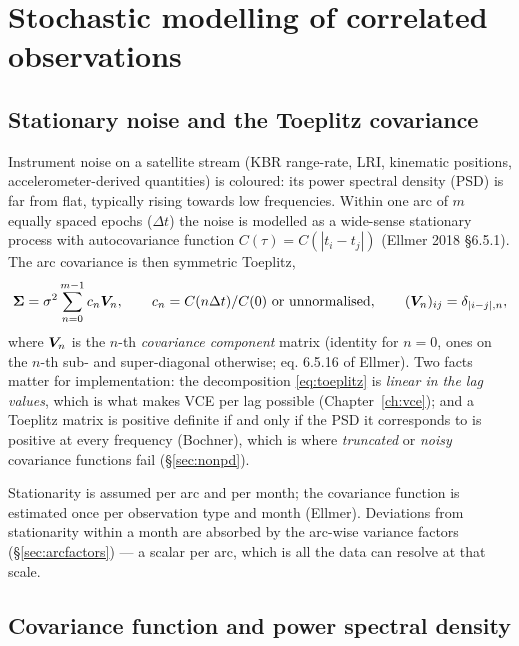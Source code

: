 \chapter{Stochastic modelling of correlated observations}
\label{ch:stochastic}

\section{Stationary noise and the Toeplitz covariance}

Instrument noise on a satellite stream (KBR range-rate, LRI, kinematic positions, accelerometer-derived quantities) is coloured: its power spectral density (PSD) is far from flat, typically rising towards low frequencies. Within one arc of $m$ equally spaced epochs ($\Delta t$) the noise is modelled as a wide-sense stationary process with autocovariance function $C(\tau) = C(|t_i - t_j|)$ (Ellmer 2018 §6.5.1). The arc covariance is then symmetric Toeplitz,
\begin{equation}
\bm{\Sigma} = \sigma^2\sum_{n=0}^{m-1} c_n \bm{V}_n, \qquad c_n = C(n\Delta t)/C(0)\ \text{or unnormalised}, \qquad (\bm{V}_n)_{ij} = \delta_{|i-j|,n},
\label{eq:toeplitz}
\end{equation}
where $\bm{V}_n$ is the $n$-th \emph{covariance component} matrix (identity for $n=0$, ones on the $n$-th sub- and super-diagonal otherwise; eq. 6.5.16 of Ellmer). Two facts matter for implementation: the decomposition \eqref{eq:toeplitz} is \emph{linear in the lag values}, which is what makes VCE per lag possible (Chapter~\ref{ch:vce}); and a Toeplitz matrix is positive definite if and only if the PSD it corresponds to is positive at every frequency (Bochner), which is where \emph{truncated} or \emph{noisy} covariance functions fail (\S\ref{sec:nonpd}).

Stationarity is assumed per arc and per month; the covariance function is estimated once per observation type and month (Ellmer). Deviations from stationarity within a month are absorbed by the arc-wise variance factors (\S\ref{sec:arcfactors}) --- a scalar per arc, which is all the data can resolve at that scale.

\section{Covariance function and power spectral density}
\label{sec:psd}

